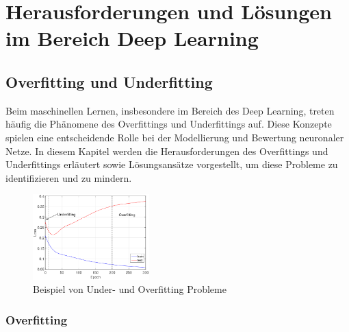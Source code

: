 \chapter{Herausforderungen und Lösungen im Bereich Deep Learning}

\section{Overfitting und Underfitting}

Beim maschinellen Lernen, insbesondere im Bereich des Deep Learning, treten häufig die Phänomene des Overfittings und Underfittings auf. Diese Konzepte spielen eine entscheidende Rolle bei der Modellierung und Bewertung neuronaler Netze. In diesem Kapitel werden die Herausforderungen des Overfittings und Underfittings erläutert sowie Lösungsansätze vorgestellt, um diese Probleme zu identifizieren und zu mindern.

\begin{figure}[h]
    \centering
    \includegraphics[width=0.4\textwidth]{img/over-under-fitting.png}
    \caption{Beispiel von Under- und Overfitting Probleme}
    \label{fig:over_under_fitting}
\end{figure}

\subsection{Overfitting}\label{sec:overfitting100}

